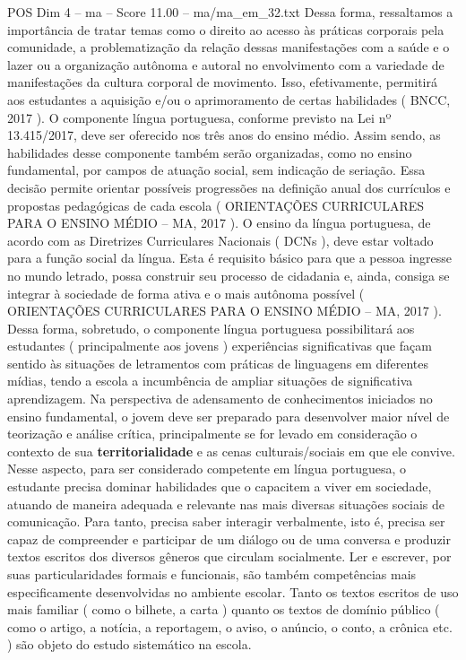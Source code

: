 \begin{textsample}{POS Dim 4 – ma – Score 11.00 – ma/ma\_em\_32.txt}
Dessa forma, ressaltamos a importância de tratar temas como o direito ao acesso às práticas corporais pela comunidade, a problematização da relação dessas manifestações com a saúde e o lazer ou a organização autônoma e autoral no envolvimento com a variedade de manifestações da cultura corporal de movimento.
Isso, efetivamente, permitirá aos estudantes a aquisição e/ou o aprimoramento de certas habilidades ( BNCC, 2017 ).
O componente língua portuguesa, conforme previsto na Lei nº 13.415/2017, deve ser oferecido nos três anos do ensino médio.
Assim sendo, as habilidades desse componente também serão organizadas, como no ensino fundamental, por campos de atuação social, sem indicação de seriação.
Essa decisão permite orientar possíveis progressões na definição anual dos currículos e propostas pedagógicas de cada escola ( ORIENTAÇÕES CURRICULARES PARA O ENSINO MÉDIO – MA, 2017 ).
O ensino da língua portuguesa, de acordo com as Diretrizes Curriculares Nacionais ( DCNs ), deve estar voltado para a função social da língua.
Esta é requisito básico para que a pessoa ingresse no mundo letrado, possa construir seu processo de cidadania e, ainda, consiga se integrar à sociedade de forma ativa e o mais autônoma possível ( ORIENTAÇÕES CURRICULARES PARA O ENSINO MÉDIO – MA, 2017 ).
Dessa forma, sobretudo, o componente língua portuguesa possibilitará aos estudantes ( principalmente aos jovens ) experiências significativas que façam sentido às situações de letramentos com práticas de linguagens em diferentes mídias, tendo a escola a incumbência de ampliar situações de significativa aprendizagem.
Na perspectiva de adensamento de conhecimentos iniciados no ensino fundamental, o jovem deve ser preparado para desenvolver maior nível de teorização e análise crítica, principalmente se for levado em consideração o contexto de sua \textbf{territorialidade} e as cenas culturais/sociais em que ele convive.
Nesse aspecto, para ser considerado competente em língua portuguesa, o estudante precisa dominar habilidades que o capacitem a viver em sociedade, atuando de maneira adequada e relevante nas mais diversas situações sociais de comunicação.
Para tanto, precisa saber interagir verbalmente, isto é, precisa ser capaz de compreender e participar de um diálogo ou de uma conversa e produzir textos escritos dos diversos gêneros que circulam socialmente.
Ler e escrever, por suas particularidades formais e funcionais, são também competências mais especificamente desenvolvidas no ambiente escolar.
Tanto os textos escritos de uso mais familiar ( como o bilhete, a carta ) quanto os textos de domínio público ( como o artigo, a notícia, a reportagem, o aviso, o anúncio, o conto, a crônica etc. ) são objeto do estudo sistemático na escola.

\end{textsample}
